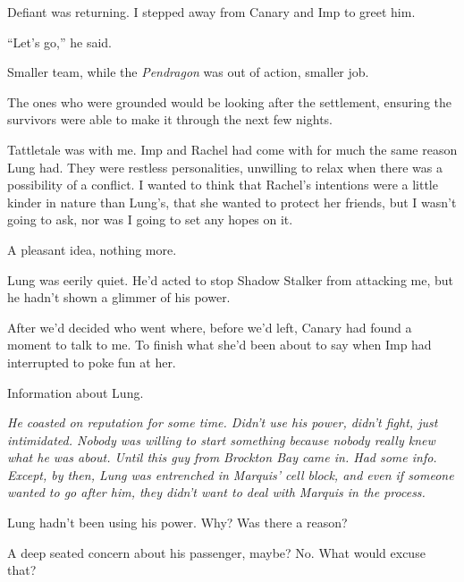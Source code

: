Defiant was returning.  I stepped away from Canary and Imp to greet him.



``Let's go,'' he said.



\sectionbreak



Smaller team, while the \emph{Pendragon }was out of action, smaller job.



The ones who were grounded would be looking after the settlement, ensuring the survivors were able to make it through the next few nights.



Tattletale was with me.  Imp and Rachel had come with for much the same reason Lung had.  They were restless personalities, unwilling to relax when there was a possibility of a conflict.  I wanted to think that Rachel's intentions were a little kinder in nature than Lung's, that she wanted to protect her friends, but I wasn't going to ask, nor was I going to set any hopes on it.



A pleasant idea, nothing more.



Lung was eerily quiet.  He'd acted to stop Shadow Stalker from attacking me, but he hadn't shown a glimmer of his power.



After we'd decided who went where, before we'd left, Canary had found a moment to talk to me.  To finish what she'd been about to say when Imp had interrupted to poke fun at her.



Information about Lung.



\emph{He coasted on reputation for some time.  Didn't use his power, didn't fight, just intimidated.  Nobody was willing to start something because nobody really knew what he was about.  Until this guy from Brockton Bay came in.  Had some info.  Except, by then, Lung was entrenched in Marquis' cell block, and even if someone wanted to go after him, they didn't want to deal with Marquis in the process.}



Lung hadn't been using his power.  Why?  Was there a reason?



A deep seated concern about his passenger, maybe?  No.  What would excuse that?



